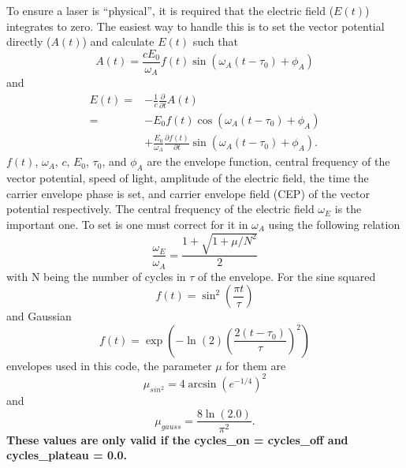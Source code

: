 \documentclass{article}
\begin{document}
To ensure a laser is ``physical'', it is required that the electric field ($E(t)$) integrates to zero. The easiest way to handle this is to set the vector potential directly ($A(t)$) and calculate $E(t)$ such that
\begin{equation}
A(t) = \frac{cE_0}{\omega_A} f(t) \sin(\omega_A(t-\tau_0)+\phi_A)
\label{eq:afield}
\end{equation}
and
\begin{equation}
\begin{split}
\label{eq:efield}
E(t) =& -\frac{1}{c}\frac{\partial}{\partial t}A(t)
\\
=&-E_0f(t) \cos(\omega_A (t-\tau_0) +\phi_A)
\\
&
+\frac{E_0}{\omega_A}\frac{\partial f(t)}{\partial t}
\sin(\omega_A (t-\tau_0) +\phi_A).
\end{split}
\end{equation}
$f(t)$, $\omega_A$,
$c$, $E_0$, $\tau_0$, and $\phi_A$ are the envelope function, central frequency of the vector potential, speed of light, amplitude of the electric field, the time the carrier envelope phase is set, and carrier envelope field (CEP) of the vector potential respectively. The central frequency of the electric field $\omega_E$ is the important one. To set is one must correct for it in $\omega_A$ using the following relation
\begin{equation}
\label{eq:fshift}
\frac{\omega_E}{\omega_A} = \frac{1+\sqrt{1+\mu/N^{2}}}{2}
\end{equation}
with N being the number of cycles in $\tau$ of the envelope. For the sine squared
\begin{equation}
f(t) = \sin^2\left(\frac{\pi t}{\tau}\right)
\label{eq:sin2}
\end{equation}
and Gaussian
\begin{equation}
f(t) = \exp\left(-\ln(2)\left(\frac{2(t-\tau_0)}{\tau}\right)^2\right)
\label{eq:gauss}
\end{equation}
envelopes used in this code, the parameter $\mu$ for them are
\begin{equation}
  \mu_{sin^2} = 4  \arcsin(e^{-1 / 4})^2
\end{equation}
and
\begin{equation}
  \mu_{gauss} = \frac{8 \ln(2.0) }{ \pi^2}.
\end{equation}
\textbf{These values are only valid if the cycles\_on = cycles\_off and cycles\_plateau = 0.0.}
\end{document}
